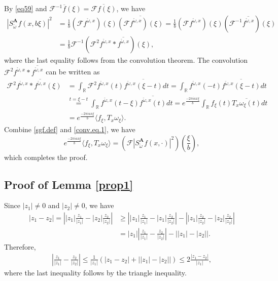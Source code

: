 \documentclass[11pt, reqno]{amsart}
\newcommand{\R}{\mathbb{R}}
\numberwithin{equation}{section}
\begin{document}
\begin{appendices}
    By \eqref{eq59} and $\mathcal{F}^{-1} \overline{f} (\xi) = \overline{\mathcal{F} f(\xi)}$, we have
	\begin{align}\label{sgf.def}
		|S_{\check{\omega}}^{\textbf{A}} f(x,b\xi)|^2 {}& = \frac{1}{b} (\mathcal{F}f^{\check{\omega},x})(\xi) \overline{(\mathcal{F}f^{\check{\omega},x})(\xi)}= \frac{1}{b} (\mathcal{F}f^{\check{\omega},x})(\xi) (\mathcal{F}^{-1} \overline{f^{\check{\omega},x}}) (\xi)\nonumber\\  
{}&= \frac{1}{b} \mathcal{F}^{-1} ( \mathcal{F}^2 f^{\check{\omega},x}\ast \overline{f^{\check{\omega},x}} ) (\xi),
	\end{align}
    where the last equality follows from the convolution theorem.
	The convolution $\mathcal{F}^2 f^{\check{\omega},x}\ast \overline{f^{\check{\omega},x}}$ can be written as
	\begin{align}\label{conv.eq.1}
		\mathcal{F}^2 f^{\check{\omega},x}\ast \overline{f^{\check{\omega},x}} (\xi) {}& = \int_{\R} \mathcal{F}^2 f^{\check{\omega},x}(t) \overline{f^{\check{\omega},x}(\xi-t)} dt
		= \int_{\R} f^{\check{\omega},x}(-t) \overline{f^{\check{\omega},x}(\xi-t)} dt\nonumber \\ 
		{}& \overset{t=\xi-t}{=} \int_{\R} f^{\check{\omega},x}(t-\xi) \overline{f^{\check{\omega},x}(t)} dt 
		 = e^{\frac{-2\pi iax\xi}{b}} \int_{\R} f_{\xi}(t) \overline{T_x \omega_{\xi} (t)} dt\nonumber \\ 
		{}& = e^{\frac{-2\pi iax\xi}{b}} \langle f_{\xi}, T_x \omega_{\xi} \rangle.
	\end{align}
	Combine \eqref{sgf.def} and \eqref{conv.eq.1}, we have 
	 \begin{equation*}\label{eq1}
		e^{\frac{-2\pi iax\xi}{b}} \langle f_\xi, T_x \omega_\xi \rangle=(\mathcal{F} |S_{\check{\omega}}^{\textbf{A}} f(x,\cdot)|^2)(\frac{\xi}{b}), 
	\end{equation*}
	which completes the proof. 


\subsection{Proof of Lemma \ref{prop1}}\label{proof.prop1}
Since $|z_1|\neq 0$ and $|z_2|\neq 0$,  we have   \begin{align*}
        |z_1 - z_2| = \left| |z_1| \frac{z_1}{|z_1|} - |z_2| \frac{z_2}{|z_2|} \right|  {}& \ge \left| |z_1| \frac{z_1}{|z_1|} - |z_1| \frac{z_2}{|z_2|} \right| - \left| |z_1| \frac{z_2}{|z_2|} - |z_2| \frac{z_2}{|z_2|} \right| \\
        {}& = |z_1| \left| \frac{z_1}{|z_1|} - \frac{z_2}{|z_2|} \right| - \big| |z_1| - |z_2| \big|.
    \end{align*}
Therefore, 
    \begin{align*}
        \left| \frac{z_1}{|z_1|} - \frac{z_2}{|z_2|} \right|  \le \frac{1}{|z_1|} (|z_1 - z_2| + \big| |z_1| - |z_2| \big|) 
         \le 2\frac{|z_1 - z_2|}{|z_1|},
    \end{align*}
    where the last inequality follows by the triangle inequality.



\end{appendices}
\end{document}
